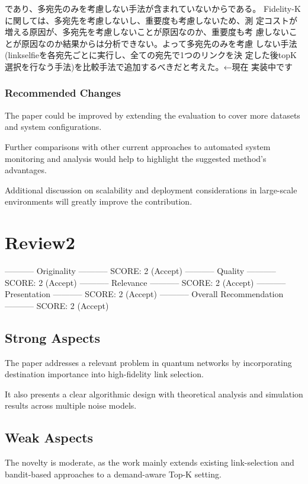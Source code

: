 \documentclass[conference,15pt]{IEEEtran}
\begin{document}
であり、多宛先のみを考慮しない手法が含まれていないからである。
Fidelity-Kに関しては、多宛先を考慮しないし、重要度も考慮しないため、測
定コストが増える原因が、多宛先を考慮しないことが原因なのか、重要度も考
慮しないことが原因なのか結果からは分析できない。よって多宛先のみを考慮
しない手法(linkselfieを各宛先ごとに実行し、全ての宛先で1つのリンクを決
定した後topK選択を行なう手法)を比較手法で追加するべきだと考えた。←現在
実装中です


\subsubsection*{Recommended Changes}
\label{sec:org41a562e}
The paper could be improved by extending the evaluation to cover more
datasets and system configurations.

Further comparisons with other current approaches to automated system
monitoring and analysis would help to highlight the suggested method's
advantages.

Additional discussion on scalability and deployment considerations in
large-scale environments will greatly improve the contribution.


\section*{Review2}
\label{sec:orgf392e16}
----------- Originality -----------
SCORE: 2 (Accept)
----------- Quality -----------
SCORE: 2 (Accept)
----------- Relevance -----------
SCORE: 2 (Accept)
----------- Presentation -----------
SCORE: 2 (Accept)
----------- Overall Recommendation -----------
SCORE: 2 (Accept)

\subsection*{Strong Aspects}
\label{sec:orgcca58b2}
The paper addresses a relevant problem in quantum networks by
incorporating destination importance into high-fidelity link
selection.

It also presents a clear algorithmic design with theoretical analysis
and simulation results across multiple noise models.

\subsection*{Weak Aspects}
\label{sec:orgae0700b}
The novelty is moderate, as the work mainly extends existing
link-selection and bandit-based approaches to a demand-aware Top-K
setting.
\end{document}
